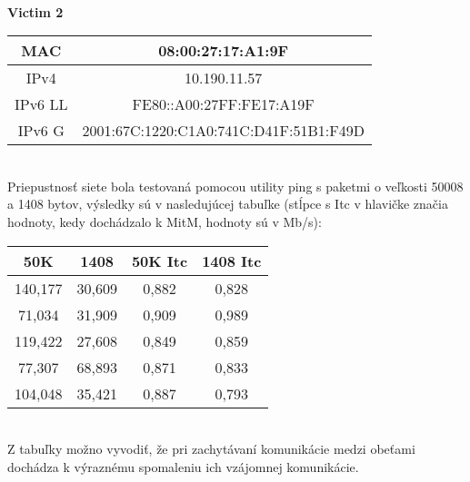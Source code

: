 \documentclass[a4paper,11pt]{article}
\begin{document}
\ \\
\textbf{Victim 2}
\begin{center}
\begin{tabular}{ |c|c| } 
 \hline
 MAC & 08:00:27:17:A1:9F \\
 \hline 
 IPv4 & 10.190.11.57 \\ 
 \hline 
 IPv6 LL & FE80::A00:27FF:FE17:A19F \\ 
 \hline 
 IPv6 G & 2001:67C:1220:C1A0:741C:D41F:51B1:F49D \\
 \hline
\end{tabular}
\end{center}
\ \\
Priepustnosť siete bola testovaná pomocou utility ping s paketmi o veľkosti 50008 a 1408 bytov, výsledky sú v nasledujúcej tabuľke (stĺpce s Itc v hlavičke značia hodnoty, kedy dochádzalo k MitM, hodnoty sú v Mb/s):
\begin{center}
\begin{tabular}{ |c|c|c|c| } 
 \hline
 50K & 1408 & 50K Itc & 1408 Itc \\
 \hline
 \hline
 140,177	& 30,609 &	0,882 &	0,828 \\
 \hline
 71,034 &	31,909 &	0,909 &	0,989 \\
 \hline
 119,422 &	27,608 &	0,849 &	0,859 \\
 \hline
 77,307 &	68,893 &	0,871 &	0,833 \\
 \hline
 104,048 &	35,421 &	0,887 &	0,793 \\
 \hline
\end{tabular}
\end{center}
\ \\
Z tabuľky možno vyvodiť, že pri zachytávaní komunikácie medzi obeťami dochádza k výraznému spomaleniu ich vzájomnej komunikácie.
\newpage

\def\refname{Literatúra}

\end{document}
